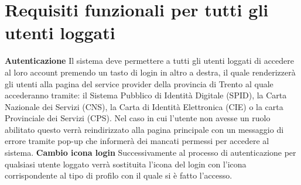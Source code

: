     \section{Requisiti funzionali per tutti gli utenti loggati}
        \begin{rfList}
            \rfItem \textbf{Autenticazione} Il sistema deve permettere a tutti gli utenti loggati di accedere al loro account premendo un tasto di login in altro a destra, il quale renderizzerà gli utenti alla pagina del service provider della provincia di Trento al quale accederanno tramite: il Sistema Pubblico di Identità Digitale (SPID), la Carta Nazionale dei Servizi (CNS), la Carta di Identità Elettronica (CIE) o la carta Provinciale dei Servizi (CPS). Nel caso in cui l'utente non avesse un ruolo abilitato questo verrà reindirizzato alla pagina principale con un messaggio di errore tramite pop-up che informerà dei mancati permessi per accedere al sistema.
            \rfItem \textbf{Cambio icona login} Successivamente al processo di autenticazione per qualsiasi utente loggato verrà sostituita l'icona del login con l'icona corrispondente al tipo di profilo con il quale si è fatto l'accesso.
        \end{rfList}     
